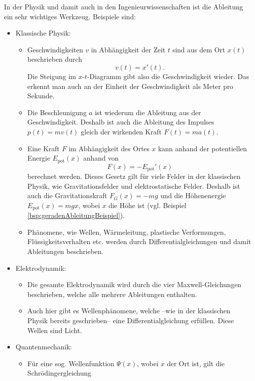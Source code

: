 \documentclass[../../main.tex]{subfiles}
\begin{document}
    \begin{example}{}
        In der Physik und damit auch in den Ingenieurwissenschaften ist die Ableitung ein sehr wichtiges Werkzeug. Beispiele sind:
        \begin{itemize}
        \item Klassische Physik:
            \begin{itemize}
                \item Geschwindigkeiten $v$ in Abhängigkeit der Zeit $t$ sind aus dem Ort $x(t)$ beschrieben durch
                    \[v(t) = x'(t).\]
                    Die Steigung im $x$-$t$-Diagramm gibt also die Geschwindigkeit wieder. Das erkennt man auch an der Einheit der Geschwindigkeit als Meter pro Sekunde.
                \item Die Beschleunigung $a$ ist wiederum die Ableitung aus der Geschwindigkeit. Deshalb ist auch die Ableitung des Impulses $p(t) = mv(t)$ gleich der wirkenden Kraft $F(t) = ma(t)$.
                \item Eine Kraft $F$ im Abhängigkeit des Ortes $x$ kann anhand der potentiellen Energie $E_\text{pot}(x)$ anhand von
                    \[F(x)=-E_\text{pot}'(x)\]
                    berechnet werden. Dieses Gesetz gilt für viele Felder in der klassischen Physik, wie Gravitationsfelder und elektrostatische Felder. Deshalb ist auch die Gravitationskraft $F_G(x)=-mg$ und die Höhenenergie $E_\text{pot}(x)=mgx$, wobei $x$ die Höhe ist (vgl. Beispiel \ref{bsp:geradenAbleitungBeispiel}).
                \item Phänomene, wie Wellen, Wärmeleitung, plastische Verformungen, Flüssigkeitsverhalten etc. werden durch Differentialgleichungen und damit Ableitungen beschrieben.
            \end{itemize}
        \item Elektrodynamik:
        \begin{itemize}
            \item Die gesamte Elektrodynamik wird durch die vier Maxwell-Gleichungen beschrieben, welche alle mehrere Ableitungen enthalten.
            \item Auch hier gibt es Wellenphänomene, welche --wie in der klassischen Physik bereits geschrieben-- eine Differentialgleichung erfüllen. Diese Wellen sind Licht.
        \end{itemize}
        \item Quantenmechanik:
        \begin{itemize}
            \item Für eine sog. Wellenfunktion $\Psi(x)$, wobei $x$ der Ort ist, gilt die Schrödingergleichung

\end{itemize}
\end{itemize}
\end{example}
\end{document}
